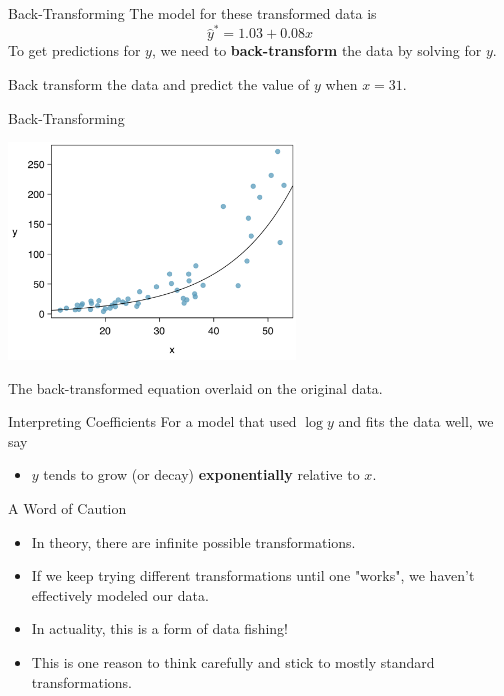 \begin{frame}{Back-Transforming}
    The model for these transformed data is
    \[
        \hat{y}^* = 1.03 + 0.08x
    \]
    To get predictions for $y$, we need to \textbf{back-transform} the data by solving for $y$.
    
    \vspace{18pt}Back transform the data and predict the value of $y$ when $x=31$.
\end{frame}

\begin{frame}{Back-Transforming}
    \vspace{-0.5cm}\begin{center}
        \includegraphics[width=3in]{images/backtran.png}
    \end{center}
    \vspace{-0.5cm}The back-transformed equation overlaid on the original data.
\end{frame}

\begin{frame}{Interpreting Coefficients}
    For a model that used $\log{y}$ and fits the data well, we say
    \begin{itemize}
        \item $y$ tends to grow (or decay) \textbf{exponentially} relative to $x$.
    \end{itemize}
\end{frame}

\begin{frame}{A Word of Caution}
    \begin{itemize}
        \item In theory, there are infinite possible transformations.
        \item If we keep trying different transformations until one "works", we haven't effectively modeled our data.
        \item In actuality, this is a form of data fishing!
        \item This is one reason to think carefully and stick to mostly standard transformations. 
    \end{itemize}
\end{frame}

